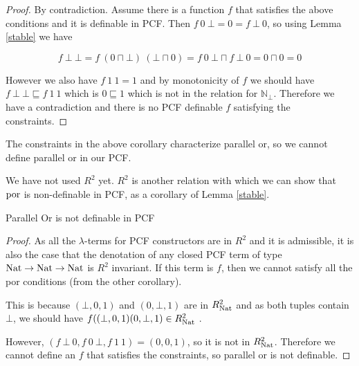 \begin{proof}{\citep{Streicher06}}
By contradiction. Assume there is a function $f$ that satisfies the above conditions and it is definable in PCF. Then $f \ 0 \ \bot = 0 = f \ \bot \ 0$, so using Lemma \ref{stable} we have

\[ f \ \bot \ \bot = f \ (0 \sqcap \bot) \ (\bot \sqcap 0) = f \ 0 \ \bot \sqcap f \ \bot \ 0 = 0 \sqcap 0 = 0 \]

However we also have $f \ 1 \ 1 = 1$ and by monotonicity of $f$ we should have $f \ \bot \ \bot \sqsubseteq f \ 1 \ 1$ which is $0 \sqsubseteq 1$ which is not in the relation for $\mathbb{N}_\bot$. Therefore we have a contradiction and there is no PCF definable $f$ satisfying the constraints.
\end{proof}

The constraints in the above corollary characterize parallel or, so we cannot define parallel or in our PCF.

We have not used $R^2$ yet. $R^2$ is another relation with which we can show that $\operatorname{por}$ is non-definable in 
PCF, as a corollary of Lemma 
 \ref{stable}.
\vspace{0.5cm}

\begin{cor}
Parallel Or is not definable in PCF 
\end{cor}

\begin{proof}{\citep{Streicher06}}
As all the $\lambda$-terms for PCF constructors are in $R^2$ and it is admissible, it is also the case that the denotation of any closed PCF term of type $\operatorname{Nat} \to \operatorname{Nat} \to \operatorname{Nat}$ is $R^2$ invariant.  If this term is $f$, then we cannot satisfy all the por conditions (from the other corollary).

This is because $(\bot, 0, 1)$ and $(0, \bot, 1)$ are in $R_{\operatorname{Nat}}^2$ and as both tuples contain $\bot$, we should have $f ((\bot, 0, 1)(0, \bot, 1) \in R_{\operatorname{Nat}}^2$ . 

However, $(f \ \bot \ 0, f \ 0 \ \bot, f \ 1 \ 1) = (0,0,1)$, so it is not in $R_{\operatorname{Nat}}^2$. Therefore we cannot define an $f$ that satisfies the constraints, so parallel or is not definable.
\end{proof}
